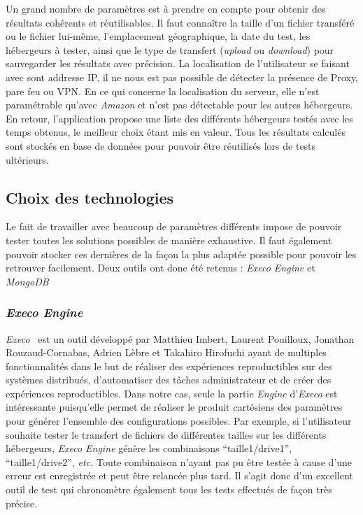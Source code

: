 \documentclass[10pt]{article}
\newcommand{\execoE}{\textit{Execo Engine}\xspace}
\begin{document}
Un grand nombre de paramètres est à prendre en compte pour obtenir des résultats
cohérents et réutilisables. Il faut connaître la taille d'un fichier transféré
ou le fichier lui-même, l'emplacement géographique, la date du test, les hébergeurs à tester, ainsi que le type de transfert
(\textit{upload} ou \textit{download}) pour sauvegarder les résultats avec
précision. La localisation de l'utilisateur se faisant avec sont addresse IP, il ne nous est pas possible de détecter la présence de Proxy, pare feu ou VPN. En ce qui concerne la localisation du serveur, elle n'est paramétrable qu'avec \textit{Amazon} et n'est pas détectable pour les autres hébergeurs. En retour, l'application propose une liste des différents hébergeurs
testés avec les temps obtenus, le meilleur choix étant mis en valeur. Tous les
résultats calculés sont stockés en base de données pour pouvoir être réutilisés
lors de tests ultérieurs.

  
\subsection{Choix des technologies}

Le fait de travailler avec beaucoup de paramètres différents impose de pouvoir
tester toutes les solutions possibles de manière exhaustive. Il faut également
pouvoir stocker ces dernières de la façon la plus adaptée possible pour pouvoir
les retrouver facilement. Deux outils ont donc été retenus : \execoE et \textit{MongoDB}

\subsubsection{\execoE}

\textit{Execo}~\cite{execo2013} est un outil développé par Matthieu
Imbert, Laurent Pouilloux, Jonathan Rouzaud-Cornabas, Adrien Lèbre et
Takahiro Hirofuchi ayant de multiples fonctionnalités dans le but de
réaliser des expériences reproductibles sur des systèmes distribués,
d'automatiser des tâches administrateur et de créer des expériences
reproductibles. Dans notre cas, seule la partie \textit{Engine}
d'\textit{Execo} est intéressante puisqu'elle permet de réaliser le
produit cartésiens des paramètres pour générer l'ensemble des
configurations possibles. Par exemple, si l'utilisateur souhaite
tester le transfert de fichiers de différentes tailles sur les
différents hébergeurs, \execoE génère les combinaisons
``taille1/drive1'', ``taille1/drive2'', \textit{etc.} Toute
combinaison n'ayant pas pu être testée à cause d'une erreur est
enregistrée et peut être relancée plus tard. Il s'agit donc d'un
excellent outil de test qui chronomètre également tous les tests
effectués de façon très précise.
\end{document}
